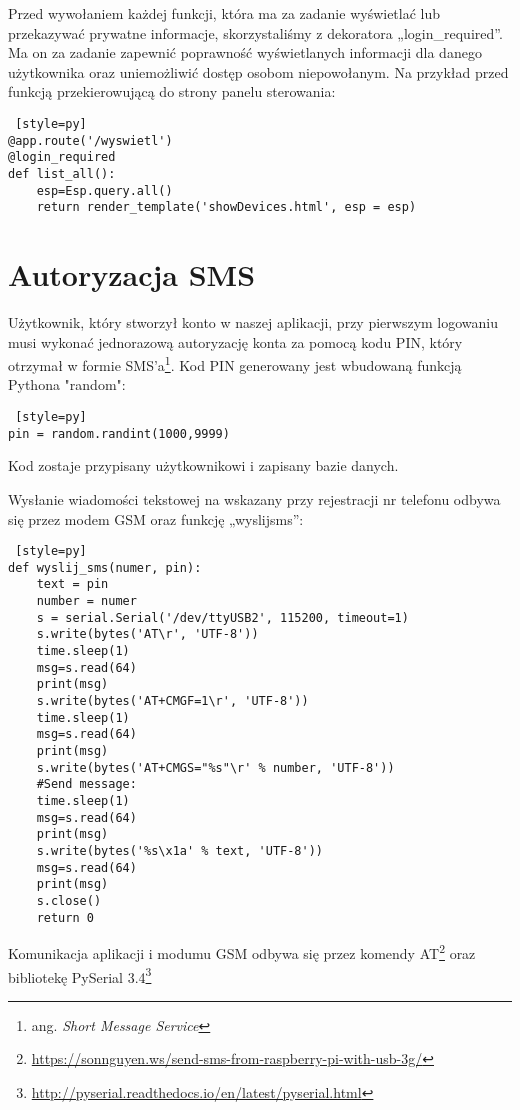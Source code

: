 \documentclass{xmgr}
\begin{document}
Przed wywołaniem każdej funkcji, która ma za zadanie wyświetlać lub przekazywać prywatne informacje, skorzystaliśmy z dekoratora „login\_required”. Ma on za zadanie zapewnić poprawność wyświetlanych informacji dla danego użytkownika oraz uniemożliwić dostęp osobom niepowołanym. Na przykład przed funkcją przekierowującą do strony panelu sterowania:

\begin{lstlisting} [style=py] 
@app.route('/wyswietl')
@login_required
def list_all():
    esp=Esp.query.all()
    return render_template('showDevices.html', esp = esp)
\end{lstlisting}

\section{Autoryzacja SMS}
Użytkownik, który stworzył konto w naszej aplikacji, przy pierwszym logowaniu musi wykonać jednorazową autoryzację konta za pomocą kodu PIN, który otrzymał w formie SMS'a\footnote{ang. \emph{Short Message Service}}. Kod PIN generowany jest 
wbudowaną funkcją Pythona "random":
\begin{lstlisting} [style=py] 
pin = random.randint(1000,9999)
\end{lstlisting}
Kod zostaje przypisany użytkownikowi i zapisany bazie danych.

Wysłanie wiadomości tekstowej na wskazany przy rejestracji nr telefonu odbywa się przez modem GSM oraz funkcję „wyslijsms”:
\begin{lstlisting} [style=py] 
def wyslij_sms(numer, pin):
    text = pin
    number = numer
    s = serial.Serial('/dev/ttyUSB2', 115200, timeout=1)
    s.write(bytes('AT\r', 'UTF-8'))
    time.sleep(1)
    msg=s.read(64)
    print(msg)
    s.write(bytes('AT+CMGF=1\r', 'UTF-8'))
    time.sleep(1)
    msg=s.read(64)
    print(msg)
    s.write(bytes('AT+CMGS="%s"\r' % number, 'UTF-8'))
    #Send message:
    time.sleep(1)
    msg=s.read(64)
    print(msg)
    s.write(bytes('%s\x1a' % text, 'UTF-8'))
    msg=s.read(64)
    print(msg)
    s.close()
    return 0
\end{lstlisting}

Komunikacja aplikacji i modumu GSM odbywa się przez komendy AT\footnote{\url{https://sonnguyen.ws/send-sms-from-raspberry-pi-with-usb-3g/}} oraz bibliotekę PySerial 3.4\cite{pyserial:2016:esp}\footnote{\url{http://pyserial.readthedocs.io/en/latest/pyserial.html}}
\end{document}
